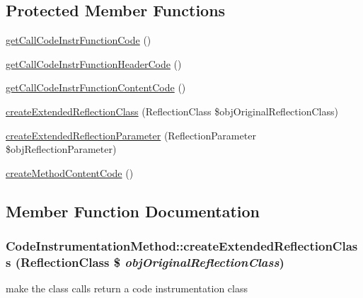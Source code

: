 \subsection*{Protected Member Functions}
\begin{CompactItemize}
\item 
\hyperlink{class_code_instrumentation_method_3442d8655a04e40edaf9626499fe9328}{getCallCodeInstrFunctionCode} ()
\item 
\hyperlink{class_code_instrumentation_method_5ac76fbcfc7bfc32c63c13d9523ec5ca}{getCallCodeInstrFunctionHeaderCode} ()
\item 
\hyperlink{class_code_instrumentation_method_b0506c97566930831078d8c53d1b70e4}{getCallCodeInstrFunctionContentCode} ()
\item 
\hyperlink{class_code_instrumentation_method_7dda8c3f7ba312f14dd22d25a2b69ec1}{createExtendedReflectionClass} (ReflectionClass \$objOriginalReflectionClass)
\item 
\hyperlink{class_code_instrumentation_method_d4a17b83d9e1fd997263bc1a9982ae3c}{createExtendedReflectionParameter} (ReflectionParameter \$objReflectionParameter)
\item 
\hyperlink{class_code_instrumentation_method_731590867f98da76937a4e5a93ec2023}{createMethodContentCode} ()
\end{CompactItemize}


\subsection{Member Function Documentation}
\hypertarget{class_code_instrumentation_method_7dda8c3f7ba312f14dd22d25a2b69ec1}{
\subsubsection[{createExtendedReflectionClass}]{\setlength{\rightskip}{0pt plus 5cm}CodeInstrumentationMethod::createExtendedReflectionClass (ReflectionClass \$ {\em objOriginalReflectionClass})}}
\label{class_code_instrumentation_method_7dda8c3f7ba312f14dd22d25a2b69ec1}


make the class calls return a code instrumentation class

